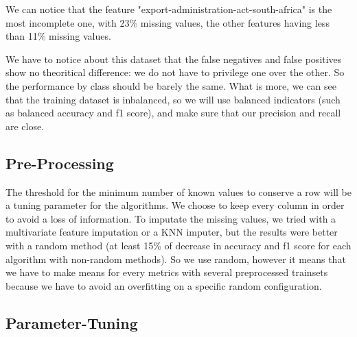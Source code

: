 \documentclass[11pt]{article}
\begin{document}
We can notice that the feature "export-administration-act-south-africa" is the most incomplete one, with 23\% missing values, the other features having less than 11\% missing values.

We have to notice about this dataset that the false negatives and false positives show no theoritical difference: we do not have to privilege one over the other. So the performance by class should be barely the same. What is more, we can see that the training dataset is inbalanced, so we will use balanced indicators (such as balanced accuracy and f1 score), and make sure that our precision and recall are close.

\subsection{Pre-Processing}

The threshold for the minimum number of known values to conserve a row will be a tuning parameter for the algorithms. We choose to keep every column in order to avoid a loss of information.
To imputate the missing values, we tried with a multivariate feature imputation or a KNN imputer, but the results were better with a random method (at least 15\% of decrease in accuracy and f1 score for each algorithm with non-random methods). So we use random, however it means that we have to make means for every metrics with several preprocessed trainsets because we have to avoid an overfitting on a specific random configuration.

\subsection{Parameter-Tuning}
\end{document}
